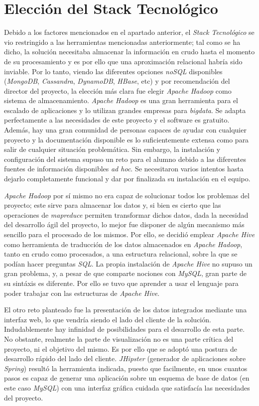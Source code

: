 \section{Elección del Stack Tecnológico}  \label{analisis.stack}
Debido a los factores mencionados en el apartado anterior, el \textit{Stack Tecnológico} se vio restringido a las herramientas mencionadas anteriormente; tal como se ha dicho, la solución necesitaba almacenar la información en crudo hasta el momento de su procesamiento y es por ello que una aproximación relacional habría sido inviable. Por lo tanto, viendo las diferentes opciones \textit{noSQL} disponibles (\textit{MongoDB}, \textit{Cassandra}, \textit{DynamoDB}, \textit{HBase}, etc) y por recomendación del director del proyecto, la elección más clara fue elegir \textit{Apache Hadoop} como sistema de almacenamiento. \textit{Apache Hadoop} es una gran herramienta para el escalado de aplicaciones y lo utilizan grandes empresas para \textit{\gls{bigdata}}. Se adapta perfectamente a las necesidades de este proyecto y el software es gratuito. Además, hay una gran comunidad de personas capaces de ayudar con cualquier proyecto y la documentación disponible es lo suficientemente extensa como para salir de cualquier situación problemática. Sin embargo, la instalación y configuración del sistema supuso un reto para el alumno debido a las diferentes fuentes de información disponibles \textit{ad hoc}. Se necesitaron varios intentos hasta dejarlo completamente funcional y dar por finalizada su instalación en el equipo. \par
\textit{Apache Hadoop} por sí mismo no era capaz de solucionar todos los problemas del proyecto; este sirve para almacenar los datos y, si bien es cierto que las operaciones de \textit{\gls{mapreduce}} permiten transformar dichos datos, dada la necesidad del desarrollo ágil del proyecto, lo mejor fue disponer de algún mecanismo más sencillo para el procesado de los mismos. Por ello, se decidió emplear \textit{Apache Hive} como herramienta de traducción de los datos almacenados en \textit{Apache Hadoop}, tanto en crudo como procesados, a una estructura relacional, sobre la que se podían hacer preguntas \textit{SQL}. La propia instalación de \textit{Apache Hive} no supuso un gran problema, y, a pesar de que comparte  nociones con \textit{MySQL}, gran parte de su sintáxis es diferente. Por ello se tuvo que aprender a usar el lenguaje para poder trabajar con las estructuras de \textit{Apache Hive}.\par
El otro reto planteado fue la presentación de los datos integrados mediante una interfaz web, lo que vendría siendo el lado del cliente de la solución. Indudablemente hay infinidad de posibilidades para el desarrollo de esta parte. No obstante, realmente la parte de visualización no es una parte crítica del proyecto, ni el objetivo del mismo. Es por ello que se adoptó una postura de desarrollo rápido del lado del cliente. \textit{JHipster} (generador de aplicaciones sobre \textit{Spring}) resultó la herramienta indicada, puesto que facilmente, en unos cuantos pasos es capaz de generar una aplicación sobre un esquema de base de datos (en este caso \textit{MySQL}) con una interfaz gráfica cuidada que satisfacía las necesidades del proyecto. 
